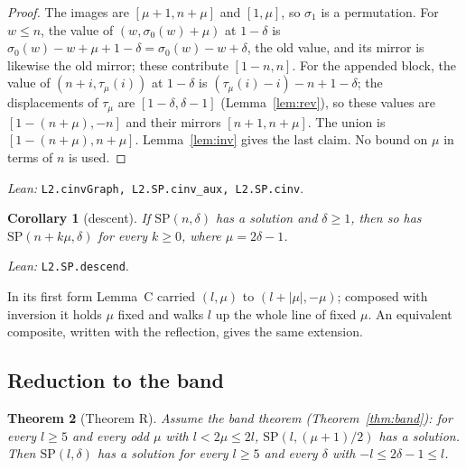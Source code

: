 \documentclass[11pt]{amsart}
\theoremstyle{plain}
\newtheorem{theorem}{Theorem}[section]
\newtheorem{corollary}[theorem]{Corollary}
\theoremstyle{definition}
\theoremstyle{remark}
\newcommand{\SP}{\mathrm{SP}}
\newcommand{\lean}[1]{\par\smallskip
  {\small\raggedright\noindent\textit{Lean:} \texttt{#1}.\par}\smallskip}
\begin{document}
\begin{proof}
The images are $[\mu+1,n+\mu]$ and $[1,\mu]$, so $\sigma_1$ is a permutation. For
$w \le n$, the value of $(w,\sigma_0(w)+\mu)$ at $1-\delta$ is
$\sigma_0(w) - w + \mu + 1 - \delta = \sigma_0(w) - w + \delta$, the old value, and its
mirror is likewise the old mirror; these contribute $[1-n,n]$. For the appended block,
the value of $(n+i,\tau_\mu(i))$ at $1-\delta$ is $(\tau_\mu(i)-i) - n + 1 - \delta$;
the displacements of $\tau_\mu$ are $[1-\delta,\delta-1]$ (Lemma~\ref{lem:rev}), so these
values are $[1-(n+\mu),-n]$ and their mirrors $[n+1,n+\mu]$. The union is
$[1-(n+\mu),n+\mu]$. Lemma~\ref{lem:inv} gives the last claim. No bound on $\mu$ in terms
of $n$ is used.
\end{proof}
\lean{L2.cinvGraph, L2.SP.cinv\_aux, L2.SP.cinv}

\begin{corollary}[descent]\label{cor:descent}
If $\SP(n,\delta)$ has a solution and $\delta \ge 1$, then so has $\SP(n + k\mu,\delta)$
for every $k \ge 0$, where $\mu = 2\delta-1$.
\end{corollary}
\lean{L2.SP.descend}

In its first form Lemma~C carried $(l,\mu)$ to $(l+|\mu|,-\mu)$; composed with inversion
it holds $\mu$ fixed and walks $l$ up the whole line of fixed $\mu$. An equivalent
composite, written with the reflection, gives the same extension.

\subsection*{Reduction to the band}

\begin{theorem}[Theorem R]\label{thm:R}
Assume the band theorem (Theorem~\ref{thm:band}): for every $l \ge 5$ and every odd
$\mu$ with $l < 2\mu \le 2l$, $\SP(l,(\mu+1)/2)$ has a solution. Then $\SP(l,\delta)$ has
a solution for every $l \ge 5$ and every $\delta$ with $-l \le 2\delta-1 \le l$.
\end{theorem}
\end{document}
